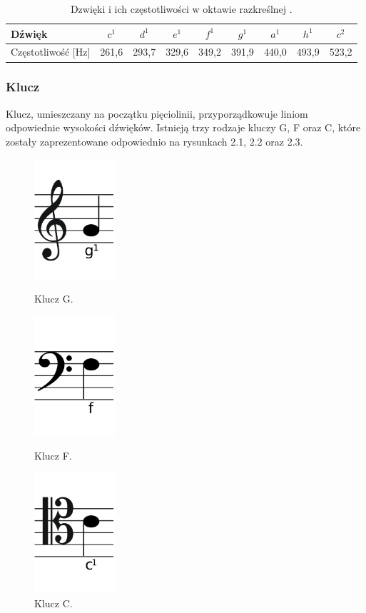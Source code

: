 \documentclass[printmode, eng]{mgr}
\newcommand\tab[1][1cm]{\hspace*{#1}}
\begin{document}
\begin{table}[!htb]
\centering
\caption{Dzwięki i ich częstotliwości w oktawie razkreślnej \cite{tab}.}
\begin{tabular}{|l|c|c|c|c|c|c|c|c|}
\hline
Dźwięk & $c^{1}$ & $d^{1}$ & $e^{1}$ & $f^{1}$ & $g^{1}$ & $a^{1}$ & $h^{1}$ & $c^{2}$  \\
\hline
Częstotliwość [Hz] & 261,6 & 293,7 & 329,6 & 349,2 & 391,9 & 440,0 & 493,9 & 523,2 \\
\hline
\end{tabular}
\end{table}
\subsubsection{Klucz}
\tab Klucz, umieszczany na początku pięciolinii, przyporządkowuje liniom odpowiednie wysokości dźwięków. Istnieją trzy rodzaje kluczy G, F oraz C, które zostały zaprezentowane odpowiednio na rysunkach 2.1, 2.2 oraz 2.3.

\begin{figure}[!htb]
\begin{minipage}{0.31\textwidth}
\centering
\includegraphics[width=3cm]{G}
\caption{Klucz G.}
\end{minipage}
\begin{minipage}{0.31\textwidth}
\centering
\includegraphics[width=3cm]{F}
\caption{Klucz F.}
\end{minipage}
\begin{minipage}{0.31\textwidth}
\centering
\includegraphics[width=3cm]{C}
\caption{Klucz C.}
\end{minipage}
\end{figure}
\end{document}
